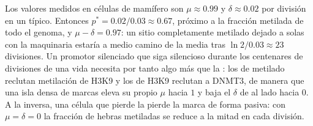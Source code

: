 \begin{example}[Números]\label{ex:b3:chromatin-epigenetics:maintenance-numbers}
Los valores medidos en células de mamífero son $\mu \approx 0.99$ y
$\delta \approx 0.02$ por división en un  típico. Entonces $p^{*} =
0.02/0.03 \approx 0.67$, próximo a la fracción metilada de todo el
genoma, y $\mu - \delta = 0.97$: un sitio completamente metilado dejado a
solas con la maquinaria estaría a medio camino de la media tras $\ln 2 /
0.03 \approx 23$ divisiones. Un promotor silenciado que siga
silencioso durante los centenares de divisiones de una vida necesita por
tanto algo más que la : los  de  metilado reclutan
metilación de H3K9 y los  de H3K9 reclutan a DNMT3, de manera que
una isla densa de marcas eleva su propio $\mu$ hacia $1$ y baja el
$\delta$ de al lado hacia $0$. A la inversa, una célula que pierde la
 pierde la marca de forma pasiva: con $\mu = \delta = 0$ la fracción
de hebras metiladas se reduce a la mitad en cada división.
\end{example}

